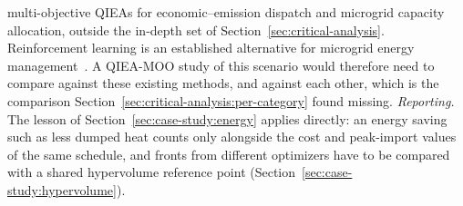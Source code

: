 multi-objective QIEAs for economic--emission dispatch and microgrid
capacity allocation, outside the in-depth set of
Section~\ref{sec:critical-analysis}. Reinforcement learning is an
established alternative for microgrid energy
management~\citep{moga2025rlmicrogrid}. A QIEA-MOO study of this
scenario would therefore need to compare against these existing
methods, and against each other, which is the comparison
Section~\ref{sec:critical-analysis:per-category} found missing.
\emph{Reporting.} The lesson of Section~\ref{sec:case-study:energy}
applies directly: an energy saving such as less dumped heat counts only
alongside the cost and peak-import values of the same schedule, and
fronts from different optimizers have to be compared with a shared
hypervolume reference point (Section~\ref{sec:case-study:hypervolume}).

